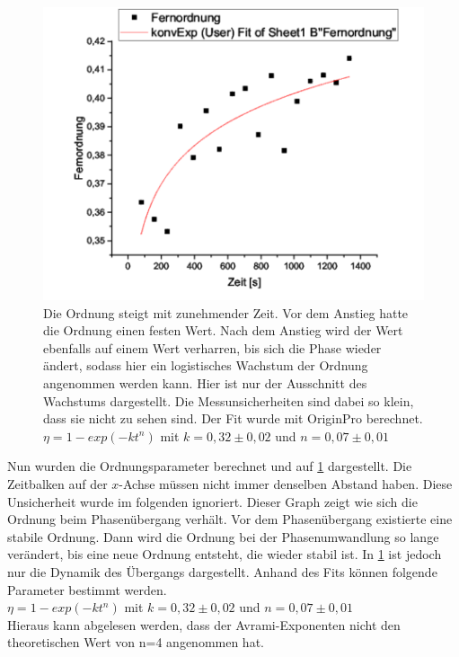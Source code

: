 \documentclass[
	a4paper,
	12pt,
	pagesize,
	ngerman
]{scrartcl}
\begin{document}
\begin{figure}[h!]
    \centering
    \includegraphics[scale = 0.7]{fit.png}
    \caption{Die Ordnung steigt mit zunehmender Zeit. Vor dem Anstieg hatte die Ordnung einen festen Wert. Nach dem Anstieg wird der Wert  ebenfalls auf einem Wert verharren, bis sich die Phase wieder ändert, sodass hier ein logistisches Wachstum der Ordnung angenommen werden kann. Hier ist nur der Ausschnitt des Wachstums dargestellt. Die Messunsicherheiten sind dabei so klein, dass sie nicht zu sehen sind. Der Fit wurde mit OriginPro berechnet.
    $\eta = 1 - exp(-kt^n)$ mit $k=0,32 \pm 0,02$ und $n=0,07 \pm 0,01$}
    \label{A5}
\end{figure}

Nun wurden die Ordnungsparameter berechnet und auf \cref{A5} dargestellt. Die Zeitbalken auf der $x$-Achse müssen nicht immer denselben Abstand haben. Diese Unsicherheit wurde im folgenden ignoriert. Dieser Graph zeigt wie sich die Ordnung beim Phasenübergang verhält. Vor dem Phasenübergang existierte eine stabile Ordnung. Dann wird die Ordnung bei der Phasenumwandlung so lange verändert, bis eine neue Ordnung entsteht, die wieder stabil ist. In \cref{A5} ist jedoch nur die Dynamik des Übergangs dargestellt. Anhand des Fits können folgende Parameter bestimmt werden. \\
$\eta = 1 - exp(-kt^n)$ mit $k=0,32 \pm 0,02$ und $n=0,07 \pm 0,01$\\
Hieraus kann abgelesen werden, dass der Avrami-Exponenten nicht den theoretischen Wert von n=4 angenommen hat.
\end{document}
